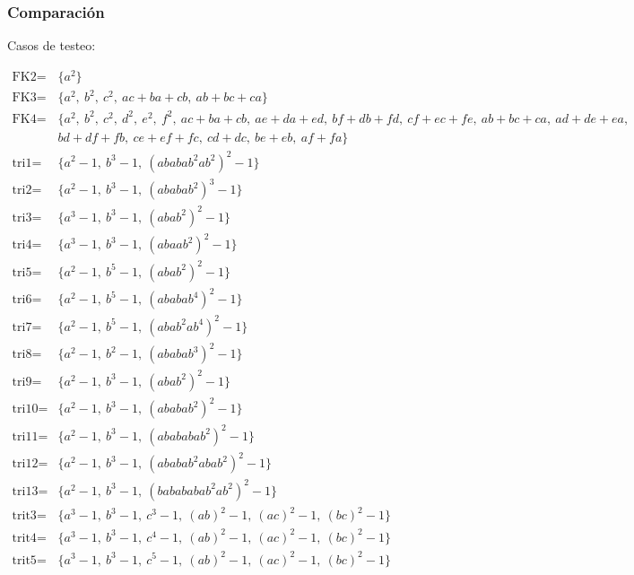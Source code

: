 \documentclass[spanish, aspectratio=169, hidecontrols]{beamer}
\begin{document}
\begin{frame}
  \frametitle{Comparación}
  Casos de testeo:
  \begin{tiny}
    \setlength{\jot}{0pt}
    \begin{align*}
      \text{FK2} =& \{a^2\} \\
      \text{FK3} =& \{a^2,\ b^2,\ c^2,\ ac + ba + cb,\ ab + bc + ca\} \\
      \text{FK4} =& \{a^2,\ b^2,\ c^2,\ d^2,\ e^2,\ f^2,\ ac + ba + cb,\ ae + da + ed,\ bf + db + fd,\ cf + ec + fe,\ ab + bc + ca,\ ad + de + ea, \\
        & bd + df + fb,\ ce + ef + fc,\ cd + dc,\ be + eb,\ af + fa\} \\
      \text{tri1} =& \{a^2 - 1,\ b^3 - 1,\ {(ababab^2ab^2)}^2 - 1\} \\
      \text{tri2} =& \{a^2 - 1,\ b^3 - 1,\ {(ababab^2)}^3 - 1\} \\
      \text{tri3} =& \{a^3 - 1,\ b^3 - 1,\ {(abab^2)}^2 - 1\} \\
      \text{tri4} =& \{a^3 - 1,\ b^3 - 1,\ {(abaab^2)}^2 - 1\} \\
      \text{tri5} =& \{a^2 - 1,\ b^5 - 1,\ {(abab^2)}^2 - 1\} \\
      \text{tri6} =& \{a^2 - 1,\ b^5 - 1,\ {(ababab^4)}^2 - 1\} \\
      \text{tri7} =& \{a^2 - 1,\ b^5 - 1,\ {(abab^2ab^4)}^2 - 1\} \\
      \text{tri8} =& \{a^2 - 1,\ b^2 - 1,\ {(ababab^3)}^2 - 1\} \\
      \text{tri9} =& \{a^2 - 1,\ b^3 - 1,\ {(abab^2)}^2 - 1\} \\
      \text{tri10} =& \{a^2 - 1,\ b^3 - 1,\ {(ababab^2)}^2 - 1\} \\
      \text{tri11} =& \{a^2 - 1,\ b^3 - 1,\ {(abababab^2)}^2 - 1\} \\
      \text{tri12} =& \{a^2 - 1,\ b^3 - 1,\ {(ababab^2abab^2)}^2 - 1\} \\
      \text{tri13} =& \{a^2 - 1,\ b^3 - 1,\ {(babababab^2ab^2)}^2 - 1\} \\
      \text{trit3} =& \{a^3 - 1,\ b^3 - 1,\ c^3 - 1,\ {(ab)}^2 - 1,\ {(ac)}^2 - 1,\ {(bc)}^2 - 1\} \\
      \text{trit4} =& \{a^3 - 1,\ b^3 - 1,\ c^4 - 1,\ {(ab)}^2 - 1,\ {(ac)}^2 - 1,\ {(bc)}^2 - 1\} \\
      \text{trit5} =& \{a^3 - 1,\ b^3 - 1,\ c^5 - 1,\ {(ab)}^2 - 1,\ {(ac)}^2 - 1,\ {(bc)}^2 - 1\}
    \end{align*}
  \end{tiny}
\end{frame}
\end{document}
